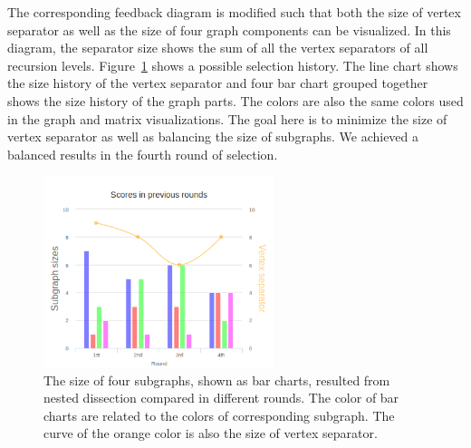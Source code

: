 \documentclass[12pt, twoside,a4paper,toc=bibliography]{scrbook}
\begin{document}
The corresponding feedback diagram is modified such that
both the size of vertex separator as well as the size of four graph components
can be visualized. In this diagram, the separator size shows the sum of all
the vertex separators of all recursion levels.
Figure~\ref{barchart} shows a possible selection history.
The line chart shows the size history of the vertex separator
and four bar chart grouped together shows the size history of the graph parts.
The colors are also the same colors used in the graph and matrix visualizations.
The goal here is to minimize the size of vertex separator as well as balancing the
size of subgraphs. We achieved a balanced results in the fourth round of selection.
\begin{figure}
\centering
\includegraphics[width=0.6\textwidth]{chart2}
\caption{The size of four subgraphs, shown as bar charts,
resulted from nested dissection compared in different rounds.
The color of bar charts are related to the colors of corresponding subgraph.
The curve of the orange color is also the size of vertex separator.}
\label{barchart}
\end{figure}

\clearpage
\end{document}
